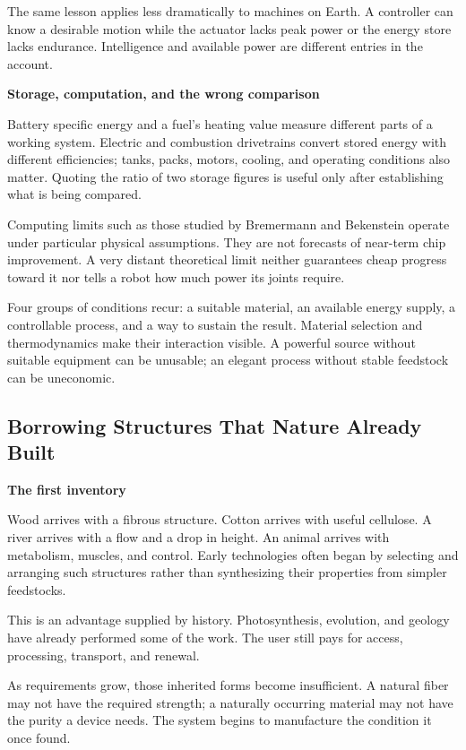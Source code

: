 \documentclass[11pt,openany]{book}
\newcommand{\subhead}[1]{\par\medskip\noindent\textbf{#1}\par\nobreak\smallskip}
\begin{document}
The same lesson applies less dramatically to machines on Earth. A controller can know a desirable motion while the actuator lacks peak power or the energy store lacks endurance. Intelligence and available power are different entries in the account.

\subhead{Storage, computation, and the wrong comparison}

Battery specific energy and a fuel's heating value measure different parts of a working system. Electric and combustion drivetrains convert stored energy with different efficiencies; tanks, packs, motors, cooling, and operating conditions also matter.\cite{placke2017lithium,ziegler2021reexamining} Quoting the ratio of two storage figures is useful only after establishing what is being compared.

Computing limits such as those studied by Bremermann and Bekenstein operate under particular physical assumptions.\cite{bremermann1982minimum,bekenstein1981universal} They are not forecasts of near-term chip improvement. A very distant theoretical limit neither guarantees cheap progress toward it nor tells a robot how much power its joints require.

Four groups of conditions recur: a suitable material, an available energy supply, a controllable process, and a way to sustain the result. Material selection and thermodynamics make their interaction visible.\cite{callen1985thermodynamics,georgescu1971entropy} A powerful source without suitable equipment can be unusable; an elegant process without stable feedstock can be uneconomic.

\subsection{Borrowing Structures That Nature Already Built}

\subhead{The first inventory}

Wood arrives with a fibrous structure. Cotton arrives with useful cellulose. A river arrives with a flow and a drop in height. An animal arrives with metabolism, muscles, and control. Early technologies often began by selecting and arranging such structures rather than synthesizing their properties from simpler feedstocks.

This is an advantage supplied by history. Photosynthesis, evolution, and geology have already performed some of the work. The user still pays for access, processing, transport, and renewal.

As requirements grow, those inherited forms become insufficient. A natural fiber may not have the required strength; a naturally occurring material may not have the purity a device needs. The system begins to manufacture the condition it once found.
\end{document}
